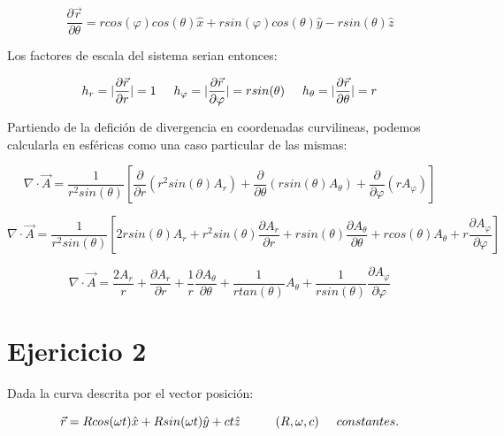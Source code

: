 \documentclass[12 pt]{article}
\begin{document}
\begin{equation*}
\frac{\partial \vec{r}}{\partial \theta} = r cos(\varphi)cos(\theta) \hat{x}+r sin(\varphi)cos(\theta)\hat{y}-r sin(\theta)\hat{z}
\end{equation*}

Los factores de escala del sistema serian entonces:

\begin{equation*}
h_{r}= |\frac{\partial\vec{r}}{\partial r}| = 1\hspace{0.5cm} h_{\varphi}= |\frac{\partial\vec{r}}{\partial \varphi }| =r sin(\theta)\hspace{0.5 cm}h_{\theta}= |\frac{\partial\vec{r}}{\partial \theta}| = r
\end{equation*}

Partiendo de la defición de divergencia en coordenadas curvilineas, podemos calcularla en esféricas como una caso particular de las mismas:


\begin{equation*}
\nabla \cdot \vec{A} = \frac{1}{r^{2}sin(\theta)} \left[ \frac{\partial}{\partial r}(r^{2}sin(\theta) A_{r}) + \frac{\partial}{ \partial \theta} (rsin(\theta) A_{\theta}) + \frac{\partial}{\partial\varphi}  (r A_{\varphi}) \right]
\end{equation*}

\begin{equation*}
\nabla \cdot \vec{A} = \frac{1}{r^{2}sin(\theta)} \left[    2rsin(\theta)A_{r} + r^{2}sin(\theta) \frac{ \partial A_{r}}{\partial r}+ rsin(\theta) \frac{\partial A_{\theta}}{\partial \theta}+ rcos(\theta) A_{\theta} +  r \frac{\partial A_{\varphi}}{\partial \varphi}\right]
\end{equation*}


\begin{equation*}
\nabla \cdot \vec{A} = \frac{2 A_{r}}{r} + \frac{\partial A_{r}}{\partial r} + \frac{1}{r} \frac{\partial A_{\theta}}{\partial \theta} + \frac{1}{r tan(\theta)} A_{\theta} + \frac{1}{r sin(\theta)}  \frac{\partial A_{\varphi} }{\partial \varphi}
\end{equation*}


\section*{Ejericicio 2}
Dada la curva descrita por el vector posición:

\begin{equation*}
\vec{r} = Rcos(\omega t) \hat{x} + Rsin(\omega t)  \hat{y} + c t \hat{z} \hspace{1cm} (R,\omega, c) \hspace{0.5cm} constantes. 
\end{equation*}
\end{document}
